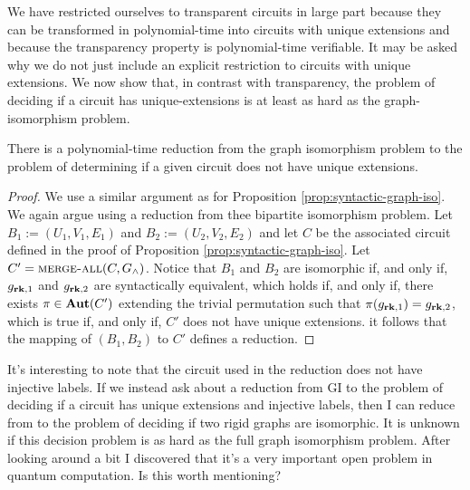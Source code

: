\documentclass[../paper.tex]{subfiles}
\begin{document}

We have restricted ourselves to transparent circuits in large part because they
can be transformed in polynomial-time into circuits with unique extensions and
because the transparency property is polynomial-time verifiable. It may be asked
why we do not just include an explicit restriction to circuits with unique
extensions. We now show that, in contrast with transparency, the problem of
deciding if a circuit has unique-extensions is at least as hard as the
graph-isomorphism problem.

\begin{lem}
  There is a polynomial-time reduction from the graph isomorphism problem to the
  problem of determining if a given circuit does not have unique extensions.
  \label{lem:unique-extensions-hard}
\end{lem}
\begin{proof}
  We use a similar argument as for Proposition \ref{prop:syntactic-graph-iso}.
  We again argue using a reduction from thee bipartite isomorphism problem. Let
  $B_1 := (U_1, V_1, E_1)$ and $B_2 := (U_2, V_2, E_2)$ and let $C$ be the
  associated circuit defined in the proof of Proposition
  \ref{prop:syntactic-graph-iso}. Let $C' = {\normalfont\textsc{merge-all}} (C, G_{\land})$.
  Notice that $B_1$ and $B_2$ are isomorphic if, and only if, $g_{\text{\textbf{rk}}, 1}$ and
  $g_{\text{\textbf{rk}}, 2}$ are syntactically equivalent, which holds if, and only if,
  there exists $\pi \in \text{\textbf{Aut}}(C')$ extending the trivial permutation such that
  $\pi (g_{\text{\textbf{rk}}, 1}) = g_{\text{\textbf{rk}}, 2}$, which is true if, and only if, $C'$ does
  not have unique extensions. it follows that the mapping of $(B_1, B_2)$ to
  $C'$ defines a reduction.
\end{proof}

\begin{remark}
  It's interesting to note that the circuit used in the reduction does not have
  injective labels. If we instead ask about a reduction from GI to the problem
  of deciding if a circuit has unique extensions and injective labels, then I
  can reduce from to the problem of deciding if two rigid graphs are isomorphic.
  It is unknown if this decision problem is as hard as the full graph
  isomorphism problem. After looking around a bit I discovered that it's a very
  important open problem in quantum computation. Is this worth mentioning?
\end{remark}
\end{document}
